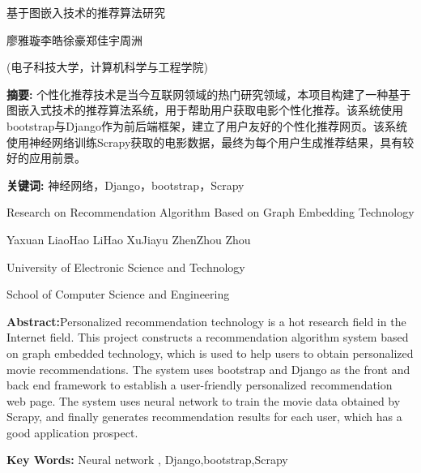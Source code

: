 \documentclass{ctexart}
\newcommand{\song}{\CJKfamily{song}}
\newcommand{\hei}{\CJKfamily{hei}}
\newcommand{\sanhao}{\fontsize{16bp}{24bp}\selectfont}       %
\newcommand{\wuhao}{\fontsize{10.5bp}{10.5bp}\selectfont}   %
\begin{document}
\begin{center}
    {\hei\sanhao 基于图嵌入技术的推荐算法研究}

    \vspace{1em}

    {\wuhao 廖雅璇\hspace{1em}李皓\hspace{1em}徐豪\hspace{1em}郑佳宇\hspace{1em}周洲}

    {\wuhao (电子科技大学，计算机科学与工程学院)}
\end{center}

{\justifying\noindent
{\bfseries\song 摘\hspace{10bp}要:} 个性化推荐技术是当今互联网领域的热门研究领域，本项目构建了一种基于图嵌入式技术的推荐算法系统，用于帮助用户获取电影个性化推荐。该系统使用bootstrap与Django作为前后端框架，建立了用户友好的个性化推荐网页。该系统使用神经网络训练Scrapy获取的电影数据，最终为每个用户生成推荐结果，具有较好的应用前景。

\noindent\textbf{\bfseries\song 关键词:} 神经网络，Django，bootstrap，Scrapy}

\vspace{2em}

\begin{center}
    {\hei\sanhao Research on Recommendation Algorithm Based on Graph Embedding Technology}

    \vspace{1em}

    {\wuhao Yaxuan Liao\hspace{1em}Hao Li\hspace{1em}Hao Xu\hspace{1em}Jiayu Zhen\hspace{1em}Zhou Zhou}

    {\wuhao University of Electronic Science and Technology  }

    {\wuhao School of Computer Science and Engineering}

\end{center}
{\justifying\noindent
{\bfseries\song Abstract:}Personalized recommendation technology is a hot research field in the Internet field. This project constructs a recommendation algorithm system based on graph embedded technology, which is used to help users to obtain personalized movie recommendations. The system uses bootstrap and Django as the front and back end framework to establish a user-friendly personalized recommendation web page. The system uses neural network to train the movie data obtained by Scrapy, and finally generates recommendation results for each user, which has a good application prospect.
 
\noindent\textbf{\bfseries\song Key Words: } Neural network , Django,bootstrap,Scrapy}
\end{document}
